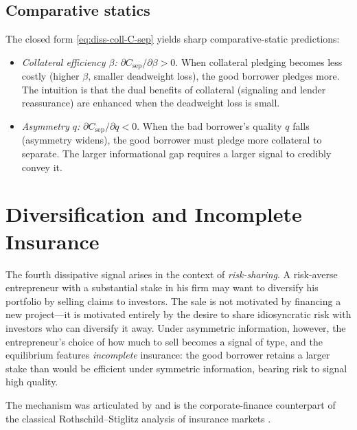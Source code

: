 \documentclass[11pt,a4paper,oneside]{book}
\theoremstyle{plain}
\theoremstyle{definition}
\theoremstyle{remark}
\numberwithin{equation}{chapter}
\begin{document}
\subsection{Comparative statics}

The closed form \eqref{eq:diss-coll-C-sep} yields sharp comparative-static predictions:

\begin{itemize}
  \item \emph{Collateral efficiency $\beta$:} $\partial C_{\text{sep}}/\partial \beta > 0$.
  When collateral pledging becomes less costly (higher $\beta$, smaller deadweight loss), the good borrower pledges more.
  The intuition is that the dual benefits of collateral (signaling and lender reassurance) are enhanced when the deadweight loss is small.
  \item \emph{Asymmetry $q$:} $\partial C_{\text{sep}}/\partial q < 0$.
  When the bad borrower's quality $q$ falls (asymmetry widens), the good borrower must pledge more collateral to separate.
  The larger informational gap requires a larger signal to credibly convey it.
\end{itemize}

\section{Diversification and Incomplete Insurance}
\label{sec:diss-divers}

The fourth dissipative signal arises in the context of \emph{risk-sharing}.
A risk-averse entrepreneur with a substantial stake in his firm may want to diversify his portfolio by selling claims to investors.
The sale is not motivated by financing a new project---it is motivated entirely by the desire to share idiosyncratic risk with investors who can diversify it away.
Under asymmetric information, however, the entrepreneur's choice of how much to sell becomes a signal of type, and the equilibrium features \emph{incomplete} insurance: the good borrower retains a larger stake than would be efficient under symmetric information, bearing risk to signal high quality.

The mechanism was articulated by \citet{LelandPyle1977} and is the corporate-finance counterpart of the classical Rothschild--Stiglitz analysis of insurance markets \citep{RothschildStiglitz1976, Stiglitz1977}.
\end{document}
